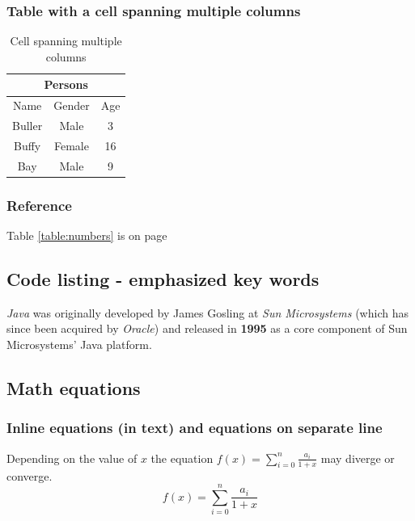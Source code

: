 \documentclass{article}
\begin{document}
        \subsubsection{Table with a cell spanning multiple columns}
            \begin{table}[!h]
                \begin{tabular}{|c|c|c|}
                    \hline
                    \multicolumn{3}{|c|}{Persons} \\ [1ex]
                    \hline
                    Name & Gender & Age \\ [1ex]
                    \hline
                    Buller & Male & 3 \\ 
                    Buffy & Female & 16 \\ 
                    Bay & Male & 9 \\ 
                    \hline
                \end{tabular}
                \centering
                \caption{Cell spanning multiple columns}
                \label{table:persons}
            \end{table}   
             
            \subsubsection{Reference}
            
            Table \ref{table:numbers} is on page \pageref{table:numbers}
    
                
    \subsection{Code listing - emphasized key words}
    \emph{Java} was originally developed by James Gosling at \emph{Sun Microsystems} (which has since been acquired by \emph{Oracle}) and released in \textbf{1995} as a core component of Sun Microsystems' Java platform. 

    \subsection{Math equations}
        \subsubsection{Inline equations (in text) and equations on separate line}
            Depending on the value of $x$ the equation \( f(x) = \sum_{i=0}^{n} \frac{a_i}{1+x} \) may diverge or converge.
            \[ f(x) = \sum_{i=0}^{n} \frac{a_i}{1+x} \]
    
\end{document}
